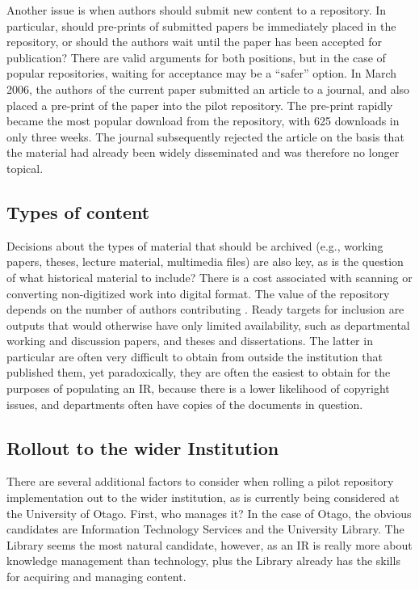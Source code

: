 \documentclass[12pt,pdftex,a4paper,titlepage]{article}
\begin{document}
Another issue is when authors should submit new content to a repository. In particular, should pre-prints of submitted papers be immediately placed in the repository, or should the authors wait until the paper has been accepted for publication? There are valid arguments for both positions, but in the case of popular repositories, waiting for acceptance may be a ``safer'' option. In March 2006, the authors of the current paper submitted an article to a journal, and also placed a pre-print of the paper into the pilot repository. The pre-print rapidly became the most popular download from the repository, with 625 downloads in only three weeks. The journal subsequently rejected the article on the basis that the material had already been widely disseminated and was therefore no longer topical.


\subsection{Types of content}

Decisions about the types of material that should be archived (e.g., working papers, theses, lecture material, multimedia files) are also key, as is the question of what historical material to include? There is a cost associated with scanning or converting non-digitized work into digital format. The value of the repository depends on the number of authors contributing \cite{Rank-J-2005-feasibility}. Ready targets for inclusion are outputs that would otherwise have only limited availability, such as departmental working and discussion papers, and theses and dissertations. The latter in particular are often very difficult to obtain from outside the institution that published them, yet paradoxically, they are often the easiest to obtain for the purposes of populating an IR, because there is a lower likelihood of copyright issues, and departments often have copies of the documents in question.


\subsection{Rollout to the wider Institution}

There are several additional factors to consider when rolling a pilot repository implementation out to the wider institution, as is currently being considered at the University of Otago. First, who manages it? In the case of Otago, the obvious candidates are Information Technology Services and the University Library. The Library seems the most natural candidate, however, as an IR is really more about knowledge management than technology, plus the Library already has the skills for acquiring and managing content.
\end{document}
